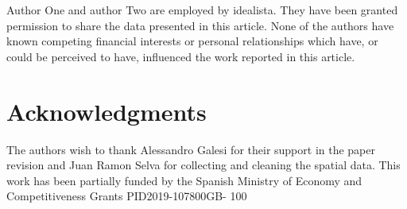 \documentclass[Royal,times,sageh]{sagej}
\begin{document}
Author One and author Two are employed by idealista. They have been
granted permission to share the data presented in this article. None of
the authors have known competing financial interests or personal
relationships which have, or could be perceived to have, influenced the
work reported in this article.

\hypertarget{acknowledgments}{%
\section{Acknowledgments}\label{acknowledgments}}

The authors wish to thank Alessandro Galesi for their support in the
paper revision and Juan Ramon Selva for collecting and cleaning the
spatial data. This work has been partially funded by the Spanish
Ministry of Economy and Competitiveness Grants PID2019-107800GB- 100



\end{document}
